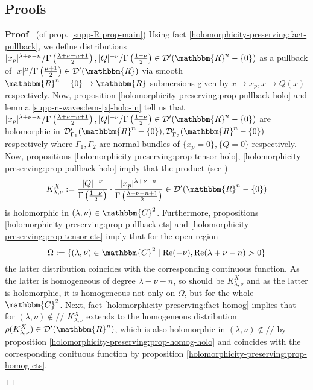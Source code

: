 \documentclass{article}
\newcommand{\assign}{:=}
\newcommand{\nin}{\not\in}
\newcommand{\tmop}[1]{\ensuremath{\operatorname{#1}}}
\renewenvironment{proof}{\noindent\textbf{Proof\ }}{\hspace*{\fill}$\Box$\medskip}
\theoremstyle{remark}
\begin{document}
\subsection{Proofs}

\begin{proof}
  (of prop. \ref{supp-R:prop-main}) Using fact
  \ref{holomorphicity-preserving:fact-pullback}, we define distributions $|
  x_p |^{\lambda + \nu - n} / \Gamma \left( \frac{\lambda + \nu - n + 1}{2}
  \right), | Q |^{- \nu} / \Gamma \left( \frac{1 - \nu}{2} \right) \in
  \mathcal{D}' (\mathbbm{R}^n - \{ 0 \})$ as a pullback of $| x |^{\mu} /
  \Gamma \left( \frac{\mu + 1}{2} \right) \in \mathcal{D}' (\mathbbm{R})$ via
  smooth $\mathbbm{R}^n - \{ 0 \} \rightarrow \mathbbm{R}$ submersions given
  by $x \mapsto x_p, x \rightarrow Q (x)$ respectively. Now, proposition
  \ref{holomorphicity-preserving:prop-pullback-holo} and lemma
  \ref{supp-n-waves:lem-|x|-holo-in} tell us that $| x_p |^{\lambda + \nu - n}
  / \Gamma \left( \frac{\lambda + \nu - n + 1}{2} \right), | Q |^{- \nu} /
  \Gamma \left( \frac{1 - \nu}{2} \right) \in \mathcal{D}' (\mathbbm{R}^n - \{
  0 \})$ are holomorphic in $\mathcal{D}'_{\Gamma_1} (\mathbbm{R}^n - \{ 0
  \}), \mathcal{D}'_{\Gamma_2} (\mathbbm{R}^n - \{ 0 \})$ respectively where
  $\Gamma_1, \Gamma_2$ are normal bundles of $\{ x_p = 0 \}, \{ Q = 0 \}$
  respectively. Now, propositions
  \ref{holomorphicity-preserving:prop-tensor-holo},
  \ref{holomorphicity-preserving:prop-pullback-holo} imply that the product
  (see {\cite{hormander1983analysis}})
  \[ K_{\lambda, \nu}^X \assign \frac{| Q |^{- \nu}}{\Gamma \left( \frac{1 -
     \nu}{2} \right)} \cdot \frac{| x_p |^{\lambda + \nu - n}}{\Gamma \left(
     \frac{\lambda + \nu - n + 1}{2} \right)} \in \mathcal{D}' (\mathbbm{R}^n
     - \{ 0 \}) \]
  is holomorphic in $(\lambda, \nu) \in \mathbbm{C}^2$. Furthermore,
  propositions \ref{holomorphicity-preserving:prop-pullback-cts} and
  \ref{holomorphicity-preserving:prop-tensor-cts} imply that for the open
  region
  \[ \Omega \assign \{ (\lambda, \nu) \in \mathbbm{C}^2 \mid \tmop{Re} (-
     \nu), \tmop{Re} (\lambda + \nu - n) > 0 \} \]
  the latter distribution coincides with the corresponding continuous
  function. As the latter is homogeneous of degree $\lambda - \nu - n$, so
  should be $K_{\lambda, \nu}^X$ and as the latter is holomorphic, it is
  homogeneous not only on $\Omega$, but for the whole $\mathbbm{C}^2$. Next,
  fact \ref{holomorphicity-preserving:fact-homog} implies that for $(\lambda,
  \nu) \nin / /$ $K_{\lambda, \nu}^X$ extends to the homogeneous distribution
  $\rho (K_{\lambda, \nu}^X) \in \mathcal{D}' (\mathbbm{R}^n)$, which is also
  holomorphic in $(\lambda, \nu) \nin / /$ by proposition
  \ref{holomorphicity-preserving:prop-homog-holo} and coincides with the
  corresponding conituous function by proposition
  \ref{holomorphicity-preserving:prop-homog-cts}.
  

\end{proof}
\end{document}
